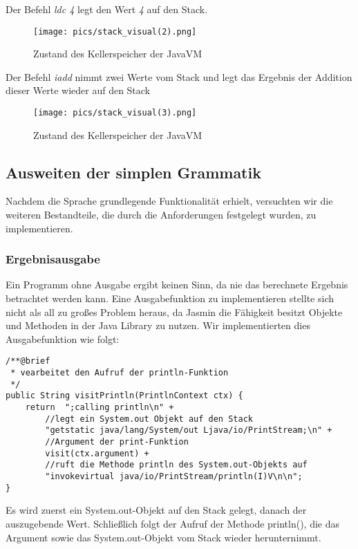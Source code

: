 Der Befehl \textit{ldc 4} legt den Wert \textit{4} auf den Stack.

\begin{figure}[h!]
\centering
\texttt{[image: pics/stack\_visual(2).png]}
\caption{Zustand des Kellerspeicher der JavaVM}
\end{figure}

Der Befehl \textit{iadd} nimmt zwei Werte vom Stack und legt das Ergebnis der Addition dieser Werte wieder auf den Stack

\begin{figure}[h!]
\centering
\texttt{[image: pics/stack\_visual(3).png]}
\caption{Zustand des Kellerspeicher der JavaVM}
\label{fig:method}
\end{figure}



\pagebreak

\subsection{Ausweiten der simplen Grammatik}
Nachdem die Sprache grundlegende Funktionalität erhielt, versuchten wir die weiteren Bestandteile, die durch die Anforderungen festgelegt wurden, zu implementieren. 


\subsubsection{Ergebnisausgabe}
Ein Programm ohne Ausgabe ergibt keinen Sinn, da nie das berechnete Ergebnis betrachtet werden kann. Eine Ausgabefunktion zu implementieren stellte sich nicht als all zu großes Problem heraus, da Jasmin die Fähigkeit besitzt Objekte und Methoden in der Java Library zu nutzen. Wir implementierten dies Ausgabefunktion wie folgt:

\scriptsize \begin{lstlisting}[frame=single]
/**@brief
 * vearbeitet den Aufruf der println-Funktion
 */
public String visitPrintln(PrintlnContext ctx) {
	return  ";calling println\n" + 
		//legt ein System.out Objekt auf den Stack
		"getstatic java/lang/System/out Ljava/io/PrintStream;\n" + 	
		//Argument der print-Funktion
		visit(ctx.argument) + 						
		//ruft die Methode println des System.out-Objekts auf
		"invokevirtual java/io/PrintStream/println(I)V\n\n"; 				
}
\end{lstlisting}

\normalsize
Es wird zuerst ein System.out-Objekt auf den Stack gelegt, danach der auszugebende Wert. Schließlich folgt der Aufruf der Methode println(), die das Argument sowie das System.out-Objekt vom Stack wieder herunternimmt.



